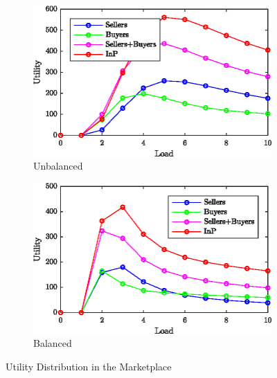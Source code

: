 \begin{figure}[htbp]
\centering
\begin{subfigure}{0.49\columnwidth}
\includegraphics[width=\columnwidth]{Figures/U-Utility-s-b-traders.eps}%
\caption{Unbalanced}%
\label{fig:utility:unbalanced}%
\end{subfigure}\hfill%
\begin{subfigure}{0.49\columnwidth}
\includegraphics[width=\columnwidth]{Figures/B-Utility-s-b-traders.eps}%
\caption{Balanced}%
\label{fig:utility:balanced}%
\end{subfigure}\hfill%
\caption{Utility Distribution in the Marketplace}
\label{fig:utility}%
\end{figure}
